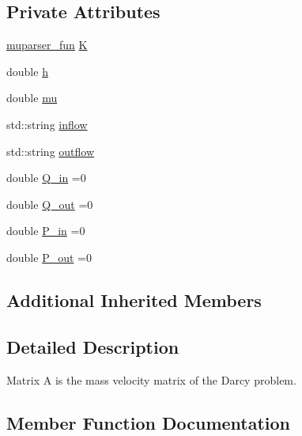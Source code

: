\subsection*{Private Attributes}
\begin{DoxyCompactItemize}
\item 
\hyperlink{classmuparser__fun}{muparser\+\_\+fun} \hyperlink{classMatrix__A_a4f7176023bc64fb41168ae596d50f28d}{K}
\item 
double \hyperlink{classMatrix__A_a0478cbd42a0688d799c243c78fc591d2}{h}
\item 
double \hyperlink{classMatrix__A_a26bdcd4e2243970aa1b25ae6a6cb1cb3}{mu}
\item 
std\+::string \hyperlink{classMatrix__A_a2b717d20be2d9f93f0af603dab158d78}{inflow}
\item 
std\+::string \hyperlink{classMatrix__A_a66d9e3023a933b7622aedd449821b8fb}{outflow}
\item 
double \hyperlink{classMatrix__A_a7be771744ff633dfda78bce1b68cc5b2}{Q\+\_\+in} =0
\item 
double \hyperlink{classMatrix__A_a79f4a0f55c11a99d755ecd2a4dd1bc29}{Q\+\_\+out} =0
\item 
double \hyperlink{classMatrix__A_a04c5dd82581ef0bb8db493c51b13e38d}{P\+\_\+in} =0
\item 
double \hyperlink{classMatrix__A_ab43806a46a28b0826c121227ffef1d13}{P\+\_\+out} =0
\end{DoxyCompactItemize}
\subsection*{Additional Inherited Members}


\subsection{Detailed Description}
Matrix A is the mass velocity matrix of the Darcy problem. 

\subsection{Member Function Documentation}
\mbox{\label{classMatrix__A_abd0cec347889e699441ffd1e8b09ee5c}} 
